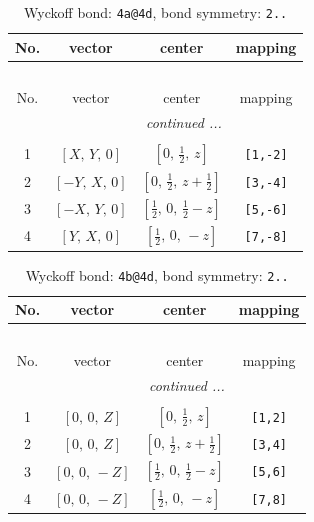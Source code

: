 \documentclass[fleqn,8pt]{jsarticle}
\begin{document}
\begin{longtable}{cccc}
\caption{Wyckoff bond: {\tt 4a@4d}, bond symmetry: {\tt 2..}}
 \\
 \hline \hline
No. & vector & center & mapping \\ \hline \endfirsthead

\multicolumn{3}{l}{\tablename\ \thetable{}} \\
 \hline \hline
No. & vector & center & mapping \\ \hline \endhead

 \hline \hline
\multicolumn{3}{r}{\footnotesize\it continued ...} \\ \endfoot

 \hline \hline
\multicolumn{3}{r}{} \\ \endlastfoot

1 & $\left[ X,\, Y,\, 0 \right]$ & $\left[ 0,\, \frac{1}{2},\, z \right]$ & {\tt [1,-2]} \\ \hline
2 & $\left[ - Y,\, X,\, 0 \right]$ & $\left[ 0,\, \frac{1}{2},\, z + \frac{1}{2} \right]$ & {\tt [3,-4]} \\ \hline
3 & $\left[ - X,\, Y,\, 0 \right]$ & $\left[ \frac{1}{2},\, 0,\, \frac{1}{2} - z \right]$ & {\tt [5,-6]} \\ \hline
4 & $\left[ Y,\, X,\, 0 \right]$ & $\left[ \frac{1}{2},\, 0,\, - z \right]$ & {\tt [7,-8]} \\
\end{longtable}
\renewcommand{\arraystretch}{1.2}
\begin{longtable}{cccc}
\caption{Wyckoff bond: {\tt 4b@4d}, bond symmetry: {\tt 2..}}
 \\
 \hline \hline
No. & vector & center & mapping \\ \hline \endfirsthead

\multicolumn{3}{l}{\tablename\ \thetable{}} \\
 \hline \hline
No. & vector & center & mapping \\ \hline \endhead

 \hline \hline
\multicolumn{3}{r}{\footnotesize\it continued ...} \\ \endfoot

 \hline \hline
\multicolumn{3}{r}{} \\ \endlastfoot

1 & $\left[ 0,\, 0,\, Z \right]$ & $\left[ 0,\, \frac{1}{2},\, z \right]$ & {\tt [1,2]} \\ \hline
2 & $\left[ 0,\, 0,\, Z \right]$ & $\left[ 0,\, \frac{1}{2},\, z + \frac{1}{2} \right]$ & {\tt [3,4]} \\ \hline
3 & $\left[ 0,\, 0,\, - Z \right]$ & $\left[ \frac{1}{2},\, 0,\, \frac{1}{2} - z \right]$ & {\tt [5,6]} \\ \hline
4 & $\left[ 0,\, 0,\, - Z \right]$ & $\left[ \frac{1}{2},\, 0,\, - z \right]$ & {\tt [7,8]} \\
\end{longtable}
\end{document}
